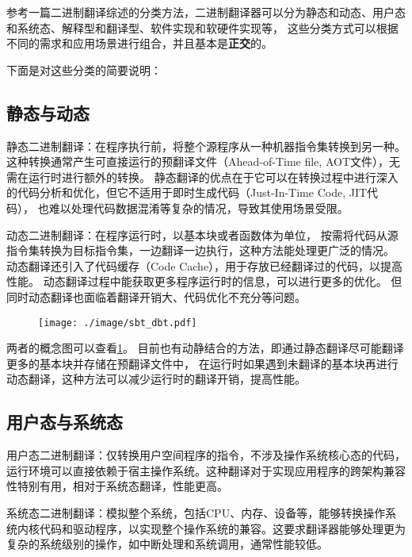 参考一篇二进制翻译综述的分类方法\cite{BT_review}，二进制翻译器可以分为静态和动态、用户态和系统态、解释型和翻译型、软件实现和软硬件实现等，
这些分类方式可以根据不同的需求和应用场景进行组合，并且基本是\textbf{正交}的。

下面是对这些分类的简要说明：

\subsection{静态与动态}
静态二进制翻译：在程序执行前，将整个源程序从一种机器指令集转换到另一种。
这种转换通常产生可直接运行的预翻译文件（Ahead-of-Time file, AOT文件），无需在运行时进行额外的转换。
静态翻译的优点在于它可以在转换过程中进行深入的代码分析和优化，但它不适用于即时生成代码（Just-In-Time Code, JIT代码），
也难以处理代码数据混淆等复杂的情况，导致其使用场景受限。

动态二进制翻译：在程序运行时，以基本块或者函数体为单位，
按需将代码从源指令集转换为目标指令集，一边翻译一边执行，这种方法能处理更广泛的情况。
动态翻译还引入了代码缓存（Code Cache），用于存放已经翻译过的代码，以提高性能。
动态翻译过程中能获取更多程序运行时的信息，可以进行更多的优化。
但同时动态翻译也面临着翻译开销大、代码优化不充分等问题。

\begin{figure}[!htbp]
  \centering
  \texttt{[image: ./image/sbt\_dbt.pdf]}
  \label{img:sbt_dbt}
\end{figure}

两者的概念图可以查看\ref{img:sbt_dbt}。
目前也有动静结合的方法，即通过静态翻译尽可能翻译更多的基本块并存储在预翻译文件中，
在运行时如果遇到未翻译的基本块再进行动态翻译，这种方法可以减少运行时的翻译开销，提高性能。

\subsection{用户态与系统态}
用户态二进制翻译：仅转换用户空间程序的指令，不涉及操作系统核心态的代码，运行环境可以直接依赖于宿主操作系统。这种翻译对于实现应用程序的跨架构兼容性特别有用，相对于系统态翻译，性能更高。

系统态二进制翻译：模拟整个系统，包括CPU、内存、设备等，能够转换操作系统内核代码和驱动程序，以实现整个操作系统的兼容。这要求翻译器能够处理更为复杂的系统级别的操作，如中断处理和系统调用，通常性能较低。

